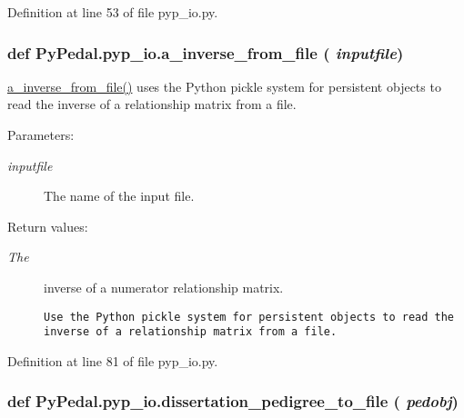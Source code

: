 Definition at line 53 of file pyp\_\-io.py.\hypertarget{namespacePyPedal_1_1pyp__io_452990288b79b685e851e35e9f248c77}{
\subsubsection[a\_\-inverse\_\-from\_\-file]{\setlength{\rightskip}{0pt plus 5cm}def Py\-Pedal.pyp\_\-io.a\_\-inverse\_\-from\_\-file ( {\em inputfile})}}
\label{namespacePyPedal_1_1pyp__io_452990288b79b685e851e35e9f248c77}


\hyperlink{namespacePyPedal_1_1pyp__io_452990288b79b685e851e35e9f248c77}{a\_\-inverse\_\-from\_\-file()} uses the Python pickle system for persistent objects to read the inverse of a relationship matrix from a file. 

\begin{Desc}
\item[Parameters:]
\begin{description}
\item[{\em inputfile}]The name of the input file. \end{description}
\end{Desc}
\begin{Desc}
\item[Return values:]
\begin{description}
\item[{\em The}]inverse of a numerator relationship matrix.

\footnotesize\begin{verbatim}Use the Python pickle system for persistent objects to read the inverse of a relationship matrix from a file.
\end{verbatim}
\normalsize
 \end{description}
\end{Desc}


Definition at line 81 of file pyp\_\-io.py.\hypertarget{namespacePyPedal_1_1pyp__io_bf331c3be82531c8de2e408951d2001b}{
\subsubsection[dissertation\_\-pedigree\_\-to\_\-file]{\setlength{\rightskip}{0pt plus 5cm}def Py\-Pedal.pyp\_\-io.dissertation\_\-pedigree\_\-to\_\-file ( {\em pedobj})}}
\label{namespacePyPedal_1_1pyp__io_bf331c3be82531c8de2e408951d2001b}


